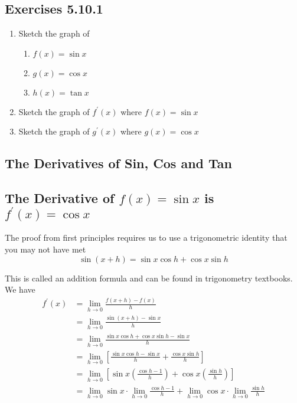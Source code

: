 \subsection{Exercises 5.10.1}
\begin{enumerate}
\item Sketch the graph of 


\begin{enumerate}
\item $f (x) =\sin  x$ 

\item $g (x) =\cos  x$ 

\item $h (x) =\tan  x$ \end{enumerate}


\item Sketch the graph of $f^{ \prime } (x)$ where $f (x) =\sin  x$ 

\item Sketch the graph of $g^{ \prime } (x)$ where $g (x) =\cos  x$ \end{enumerate}


\subsection{The Derivatives of Sin, Cos and Tan}


\subsection{The Derivative of $f (x) =\sin  x$ is $f^{ \prime } (x) =\cos  x$}
The proof from first principles requires us to use a trigonometric identity that you may not have met
\begin{equation*}\sin  (x +h) =\sin  x \cos  \text{}h +\cos  x \sin  \text{}h
\end{equation*}

This is called an addition formula and can be found in trigonometry textbooks. We
have
\begin{align*}f^{ \prime } (x) &  = \underset{h \rightarrow 0}{\lim }\frac{f (x +h) -f (x)}{h} \\
 &  = \underset{h \rightarrow 0}{\lim }\frac{\sin  (x +h) -\sin  x}{h} \\
 &  = \underset{h \rightarrow 0}{\lim }\frac{\sin  x \cos  \text{}h +\cos  x \sin  \text{}h -\sin  x}{h} \\
 &  = \underset{h \rightarrow 0}{\lim }\left [\frac{\sin  x \cos  \text{}h -\sin  x}{h} +\frac{\cos  x \sin  \text{}h}{h}\right ] \\
 &  = \underset{h \rightarrow 0}{\lim }\left [\sin  x \genfrac{(}{)}{}{}{\cos  \text{}h -1}{h} +\cos  x \genfrac{(}{)}{}{}{\sin  \text{}h}{h}\right ] \\
 &  = \underset{h \rightarrow 0}{\lim }\sin  x \cdot \underset{h \rightarrow 0}{\lim } \frac{\cos  \text{}h -1}{h} +\underset{h \rightarrow 0}{\lim }\cos  x \cdot \underset{h \rightarrow 0}{\lim } \frac{\sin  \text{}h}{h}\end{align*}

